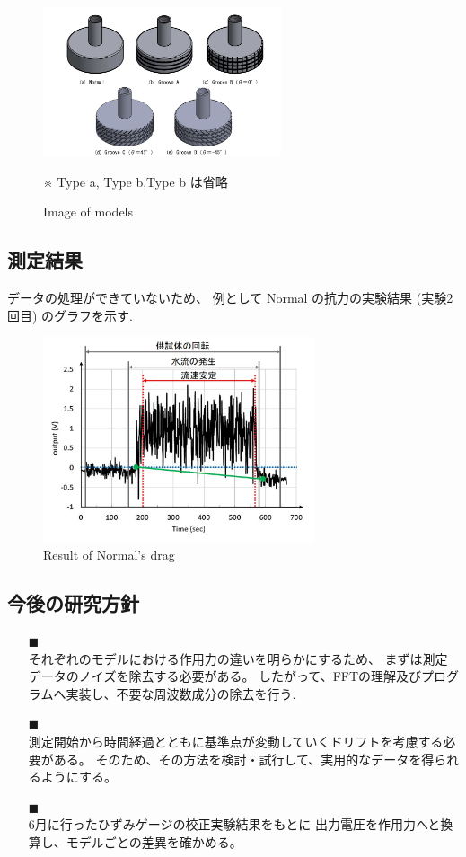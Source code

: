 \documentclass[twocolumn,a4j]{jsarticle}
\begin{document}
\begin{figure}[htbp]
    \footnotesize
    \begin{center}
        \includegraphics[width=70mm]{images/models_1.jpg}
        \caption{Image of models}
        ※ Type a, Type b,Type b は省略
    \end{center}
\end{figure}
\subsection{測定結果}
データの処理ができていないため、
例として Normal の抗力の実験結果 (実験2回目) のグラフを示す.
\begin{figure}[htbp]
    \begin{center}
        \includegraphics[width=80mm]{images/graph.jpg}
        \caption{Result of Normal's drag}
    \end{center}
\end{figure}
\newpage
\subsection{今後の研究方針}
\begin{itemize}
    \item [$\blacksquare$] \\
          それぞれのモデルにおける作用力の違いを明らかにするため、
          まずは測定データのノイズを除去する必要がある。
          したがって、FFTの理解及びプログラムへ実装し、不要な周波数成分の除去を行う.
    \item [$\blacksquare$] \\
          測定開始から時間経過とともに基準点が変動していくドリフトを考慮する必要がある。
          そのため、その方法を検討・試行して、実用的なデータを得られるようにする。
    \item [$\blacksquare$] \\
          6月に行ったひずみゲージの校正実験結果をもとに
          出力電圧を作用力へと換算し、モデルごとの差異を確かめる。
\end{itemize}
\end{document}
